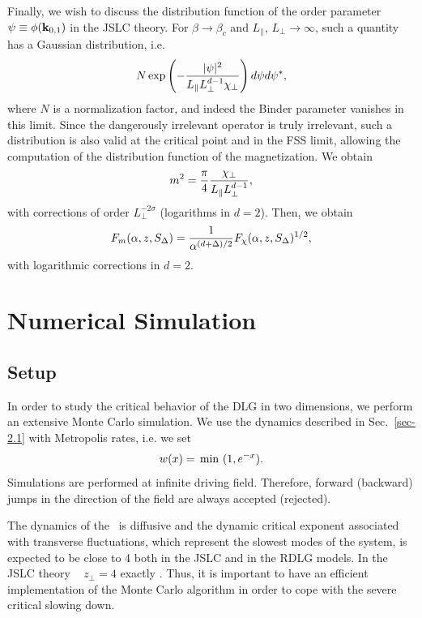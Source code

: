 \documentclass[12pt]{article}
\begin{document}
Finally, we wish to discuss the distribution function of the order parameter
$\psi\equiv\phi({\bf k}_{0,1})$ in the JSLC theory. 
For $\beta\to \beta_c$ and $L_\|$, 
$L_\bot\to\infty$, such a quantity has a Gaussian distribution, i.e. 
\begin{equation}
N \exp\left( - {|\psi|^2\over L_\| L_\bot^{d-1} \chi_\bot}\right) 
   d\psi d\psi^*,
\label{distribution-fun}
\end{equation}
where $N$ is a normalization factor,
and indeed the Binder parameter vanishes in this limit. Since 
the dangerously irrelevant operator is truly irrelevant, 
such a distribution is also valid at the critical point and in the FSS limit, 
allowing the computation of the distribution function of the magnetization.
We obtain
\begin{equation}
m^2 = {\pi\over 4} {\chi_\bot\over L_\| L_\bot^{d-1}}, 
\end{equation}
with corrections of order $L_\bot^{-2\sigma}$ 
(logarithms in $d=2$).
Then, we obtain
\begin{equation}
F_m(\alpha,z,S_\Delta) = {1\over \alpha^{(d+\Delta)/2}} 
      F_\chi(\alpha,z,S_\Delta)^{1/2},
\label{Fmtheor}
\end{equation}
with logarithmic corrections in $d=2$.


\section{Numerical Simulation}
\label{sec:simulations}

\subsection{Setup}

In order to 
study the critical behavior of the DLG in two dimensions, we perform an 
extensive Monte Carlo simulation. 
We use the dynamics described in Sec.~\ref{sec-2.1} with Metropolis rates,
i.e. we set
\begin{equation}
w(x) =\, {\rm min}\ (1,e^{-x}).
\end{equation}
Simulations are performed at infinite driving field. Therefore,
forward (backward) jumps in the direction of the field are always
accepted (rejected).

The dynamics of the \dlg\ is diffusive and the dynamic critical 
exponent associated with transverse fluctuations, which represent the slowest 
modes of the system, is expected to be close to 4 both in the JSLC and in the 
RDLG models. In the JSLC theory 
~\cite{Janssen86a} $z_\bot=4$ exactly . 
Thus, it is important to have
an efficient implementation of the Monte Carlo algorithm in
order to cope with  the severe critical slowing down.     
\end{document}
